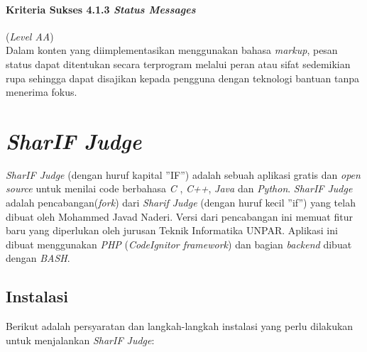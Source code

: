 \paragraph{Kriteria Sukses 4.1.3 \textit{Status Messages}}
\label{subsec:kriteria_4.1.3}
(\textit{Level AA}) \\

Dalam konten yang diimplementasikan menggunakan bahasa \textit{markup}, pesan status dapat ditentukan secara terprogram melalui peran atau sifat sedemikian rupa sehingga dapat disajikan kepada pengguna dengan teknologi bantuan tanpa menerima fokus.

\section{\textit{SharIF Judge}}
\label{sec:SharIF_Judge}
\textit{SharIF Judge} \cite{SharIF_Judge} (dengan huruf kapital ''IF'') adalah sebuah aplikasi gratis dan \textit{open source} untuk menilai code berbahasa \textit{C} , \textit{C++}, \textit{Java} dan \textit{Python}. \textit{SharIF Judge} adalah pencabangan(\textit{fork}) dari \textit{Sharif Judge} \cite{Sharif_Judge_Original} (dengan huruf kecil ''if'') yang telah dibuat oleh Mohammed Javad Naderi. Versi dari pencabangan ini memuat fitur baru yang diperlukan oleh jurusan Teknik Informatika UNPAR. Aplikasi ini dibuat menggunakan \textit{PHP} (\textit{CodeIgnitor framework})\cite{Codeigniter} dan bagian \textit{backend} dibuat dengan \textit{BASH}.

\subsection{Instalasi}
\label{subsec:instalasi}
Berikut adalah persyaratan dan langkah-langkah instalasi yang perlu dilakukan untuk menjalankan \textit{SharIF Judge}:

